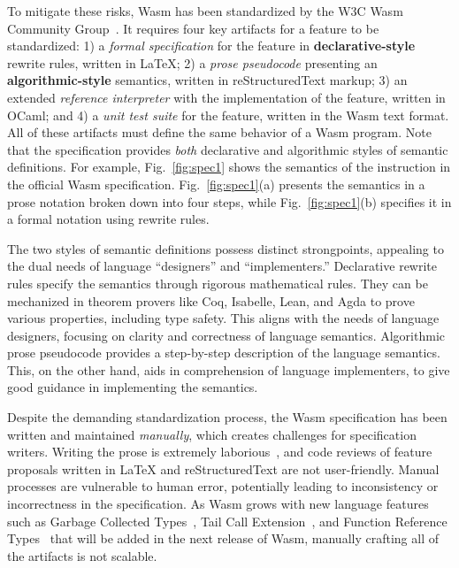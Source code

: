 To mitigate these risks, Wasm has been standardized by
the W3C Wasm Community Group~\cite{wasm-w3c}.
It requires four key artifacts for a feature to be standardized:
1) a \textit{formal specification} for the feature in \textbf{declarative-style} rewrite rules, written in LaTeX;
2) a \textit{prose pseudocode} presenting an \textbf{algorithmic-style} semantics, written in reStructuredText markup;
3) an extended \textit{reference interpreter} with the implementation of the feature, written in OCaml; and
4) a \textit{unit test suite} for the feature, written in the Wasm text format.
All of these artifacts must define the same behavior of a Wasm program.
Note that the specification provides \textit{both} declarative and algorithmic styles of semantic definitions.
For example, Fig.~\ref{fig:spec1} shows the semantics of the
 instruction in the official Wasm specification.
Fig.~\ref{fig:spec1}(a) presents the semantics in a prose notation broken down into four steps,
while Fig.~\ref{fig:spec1}(b) specifies it in a formal notation using rewrite rules.

The two styles of semantic definitions possess distinct strongpoints,
appealing to the dual needs of language ``designers'' and ``implementers.''
Declarative rewrite rules specify the semantics through rigorous mathematical rules.
They can be mechanized in theorem provers like Coq, Isabelle, Lean, and Agda
to prove various properties, including type safety.
This aligns with the needs of language designers,
focusing on clarity and correctness of language semantics.
Algorithmic prose pseudocode provides a step-by-step description of the language semantics.
This, on the other hand, aids in comprehension of language implementers,
to give good guidance in implementing the semantics.

Despite the demanding standardization process, the Wasm specification has been
written and maintained \textit{manually}, which creates challenges for specification writers.
Writing the prose is extremely laborious~\cite{Andreasicfp23}, and code reviews of
feature proposals written in LaTeX and reStructuredText are not user-friendly.
Manual processes are vulnerable to human error, potentially leading
to inconsistency or incorrectness in the specification.
As Wasm grows with new language features such as Garbage Collected Types~\cite{wasm-gc},
Tail Call Extension~\cite{wasm-tce}, and Function Reference Types~\cite{wasm-frt}
that will be added in the next release of Wasm, manually crafting all of the artifacts is not scalable.


